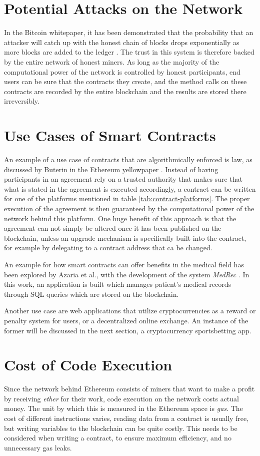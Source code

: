 \section*{Potential Attacks on the Network}
In the Bitcoin whitepaper, it has been demonstrated that the probability that an attacker will catch up with the honest chain of blocks drops exponentially as more blocks are added to the ledger \cite[p.~7]{Nakamoto2009}. The trust in this system is therefore backed by the entire network of honest miners. As long as the majority of the computational power of the network is controlled by honest participants, end users can be sure that the contracts they create, and the method calls on these contracts are recorded by the entire blockchain and the results are stored there irreversibly.
\section*{Use Cases of Smart Contracts}
An example of a use case of contracts that are algorithmically enforced is law, as discussed by Buterin in the Ethereum yellowpaper \cite[p.~2]{Buterin2013}. Instead of having participants in an agreement rely on a trusted authority that makes sure that what is stated in the agreement is executed accordingly, a contract can be written for one of the platforms mentioned in table \ref{tab:contract-platforms}. The proper execution of the agreement is then guaranteed by the computational power of the network behind this platform. One huge benefit of this approach is that the agreement can not simply be altered once it has been published on the blockchain, unless an upgrade mechanism is specifically built into the contract, for example by delegating to a contract address that ca be changed.

An example for how smart contracts can offer benefits in the medical field has been explored by Azaria et al., with the development of the system \emph{MedRec} \cite{azaria2016medrec}. In this work, an application is built which manages patient's medical records through SQL queries which are stored on the blockchain. 

Another use case are web applications that utilize cryptocurrencies as a reward or penalty system for users, or a decentralized online exchange. An instance of the former will be discussed in the next section, a cryptocurrency sportsbetting app.
\section*{Cost of Code Execution}
Since the network behind Ethereum consists of miners that want to make a profit by receiving \emph{ether} for their work, code execution on the network costs actual money. The unit by which this is measured in the Ethereum space is \emph{gas}. The cost of different instructions varies, reading data from a contract is usually free, but writing variables to the blockchain can be quite costly. This needs to be considered when writing a contract, to ensure maximum efficiency, and no unnecessary gas leaks.

